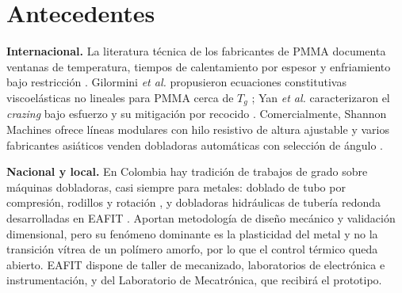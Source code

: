 \section{Antecedentes}

\noindent\textbf{Internacional.} La literatura técnica de los fabricantes de PMMA documenta ventanas de temperatura, tiempos de calentamiento por espesor y enfriamiento bajo restricción \cite{plexiglas_forming,throne2008}. Gilormini \emph{et al.} propusieron ecuaciones constitutivas viscoelásticas no lineales para PMMA cerca de $T_g$ \cite{gilormini2010}; Yan \emph{et al.} caracterizaron el \emph{crazing} bajo esfuerzo y su mitigación por recocido \cite{yan2023}. Comercialmente, Shannon Machines ofrece líneas modulares con hilo resistivo de altura ajustable \cite{shannon_line,shannon_bending} y varios fabricantes asiáticos venden dobladoras automáticas con selección de ángulo \cite{mic_auto}.

\noindent\textbf{Nacional y local.} En Colombia hay tradición de trabajos de grado sobre máquinas dobladoras, casi siempre para metales: doblado de tubo por compresión, rodillos y rotación \cite{uniandes2003}, y dobladoras hidráulicas de tubería redonda desarrolladas en EAFIT \cite{eafit_hidraulica}. Aportan metodología de diseño mecánico y validación dimensional, pero su fenómeno dominante es la plasticidad del metal y no la transición vítrea de un polímero amorfo, por lo que el control térmico queda abierto. EAFIT dispone de taller de mecanizado, laboratorios de electrónica e instrumentación, y del Laboratorio de Mecatrónica, que recibirá el prototipo.
